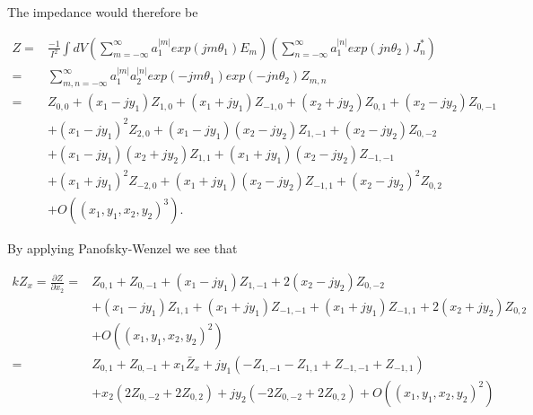 The impedance would therefore be

\begin{align}
Z = &\frac{-1}{I^{2}} \int dV \left( \displaystyle\sum\limits^{\infty}_{m=-\infty} a_{1}^{|m|} exp \left( jm\theta_{1} \right) E_{m}\right) \left( \displaystyle\sum\limits^{\infty}_{n=-\infty} a_{1}^{|n|} exp \left( jn\theta_{2} \right) J^{*}_{n}\right) \nonumber \\
   = &\displaystyle\sum\limits^{\infty}_{m,n=-\infty} a_{1}^{|m|} a_{2}^{|n|} exp\left( -jm\theta_{1} \right) exp\left( -jn\theta_{2} \right) Z_{m,n} \nonumber \\
   = &Z_{0,0} + \left( x_{1}- jy_{1} \right)Z_{1,0} + \left( x_{1} + jy_{1} \right)Z_{-1,0} + \left( x_{2} + jy_{2} \right)Z_{0,1} +  \left( x_{2} - jy_{2} \right)Z_{0,-1} \nonumber \\
      & +\left( x_{1} - jy_{1} \right)^{2}Z_{2,0} +  \left( x_{1} - jy_{1} \right)\left( x_{2} - jy_{2} \right)Z_{1,-1} + \left( x_{2} - jy_{2} \right) Z_{0,-2} \nonumber \\
      & +\left( x_{1} - jy_{1} \right)\left( x_{2} + jy_{2} \right)Z_{1,1} + \left( x_{1} + jy_{1} \right) \left( x_{2} - jy_{2} \right) Z_{-1,-1} \nonumber \\
      & +\left( x_{1} + jy_{1} \right)^{2}Z_{-2,0} + \left( x_{1} + jy_{1} \right)\left( x_{2} - jy_{2} \right) Z_{-1,1} + \left( x_{2} - jy_{2} \right)^{2}Z_{0,2} \nonumber \\
      & +O\left( \left(  x_{1},y_{1},x_{2},y_{2} \right)^{3} \right).
\label{eqn:gen_imp}
\end{align}

By applying Panofsky-Wenzel we see that

\begin{align}
kZ_{x} =\frac{\partial Z}{\partial x_{2}} = & Z_{0,1} + Z_{0,-1} + \left( x_{1} - jy_{1} \right) Z_{1,-1} + 2\left( x_{2} - jy_{2} \right) Z_{0,-2} \nonumber \\
						&+ \left( x_{1} - jy_{1} \right) Z_{1,1} + \left( x_{1} + jy_{1} \right) Z_{-1,-1} + \left( x_{1} + jy_{1} \right) Z_{-1,1} + 2\left( x_{2} + jy_{2} \right) Z_{0,2} \nonumber \\
						& + O\left( \left( x_{1},y_{1},x_{2},y_{2} \right)^{2} \right) \nonumber \\
						= & Z_{0,1} + Z_{0,-1} + x_{1}\bar{Z}_{x} + jy_{1} \left( -Z_{1,-1} - Z_{1,1} + Z_{-1,-1} + Z_{-1,1} \right) \nonumber \\
						& + x_{2}\left( 2Z_{0,-2} + 2Z_{0,2}  \right) + jy_{2}\left( -2Z_{0,-2} + 2Z_{0,2}  \right) +  O\left( \left( x_{1},y_{1},x_{2},y_{2} \right)^{2} \right)
\end{align}

